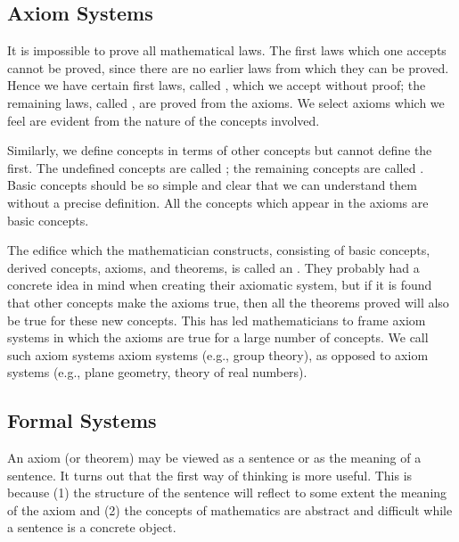 \subsection{Axiom Systems}


It is impossible to prove all mathematical laws. The first laws which one accepts cannot be proved, since there are no earlier laws from which they can be proved.
Hence we have certain first laws, called , which we accept without proof; the remaining laws, called , are proved from the axioms.
We select axioms which we feel are evident from the nature of the concepts involved.

Similarly, we define concepts in terms of other concepts but cannot define the first.
The undefined concepts are called ;
the remaining concepts are called .
Basic concepts should be so simple and clear that we can understand them without a precise definition.
All the concepts which appear in the axioms are basic concepts.

The edifice which the mathematician constructs, consisting of basic concepts, derived concepts, axioms, and theorems, is called an .
They probably had a concrete idea in mind when creating their axiomatic system, but if it is found that other concepts make the axioms true, then all the theorems proved will also be true for these new concepts.
This has led mathematicians to frame axiom systems in which the axioms are true for a large number of concepts.
We call such axiom systems  axiom systems (e.g., group theory), as opposed to  axiom systems (e.g., plane geometry, theory of real numbers).


\subsection{Formal Systems}

An axiom (or theorem) may be viewed as a sentence or as the meaning of a sentence.
It turns out that the first way of thinking is more useful.
This is because (1) the structure of the sentence will reflect to some extent the meaning of the axiom and (2) the concepts of mathematics are abstract and difficult while a sentence is a concrete object.

